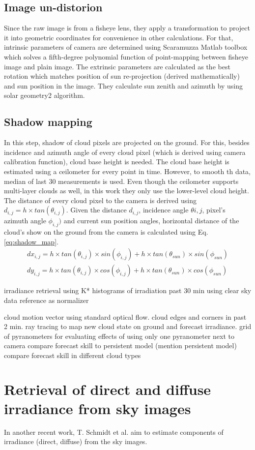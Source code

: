\subsection{Image un-distorion}
Since the raw image is from a fisheye lens, they apply a transformation to project it into geometric coordinates for convenience in other calculations. For that, intrinsic parameters of camera are determined using Scaramuzza Matlab toolbox \cite{fisheye_undistort} which solves a fifth-degree polynomial function of point-mapping between fisheye image and plain image. The extrinsic parameters are calculated as the best rotation which matches position of sun re-projection (derived mathematically) and sun position in the image. They calculate sun zenith and azimuth by using solar geometry2 algorithm\cite{sun_pos1}.

\subsection{Shadow mapping}
In this step, shadow of cloud pixels are projected on the ground. For this, besides incidence and azimuth angle of every cloud pixel (which is derived using camera calibration function), cloud base height is needed. The cloud base height is estimated using a ceilometer for every point in time. However, to smooth th data, median of last 30 measurements is used. Even though the ceilometer supports multi-layer clouds as well, in this work they only use the lower-level cloud height. The distance of every cloud pixel to the camera is derived using $d_{i,j} = h \times tan(\theta_{i,j})$. Given the distance $d_{i,j}$, incidence angle $\theta{i,j}$, pixel's azimuth angle $\phi_{i,j})$ and current sun position angles, horizontal distance of the cloud's show on the ground from the camera is calculated using Eq. \ref{eq:shadow_map}.
\begin{equation}
\label{eq:shadow_map}
\begin{split}
dx_{i,j} = h \times tan(\theta_{i,j}) \times sin(\phi_{i,j}) + h \times  tan(\theta_{sun}) \times sin(\phi_{sun}) \\
dy_{i,j} = h \times tan(\theta_{i,j}) \times cos(\phi_{i,j}) + h \times  tan(\theta_{sun}) \times cos(\phi_{sun})
\end{split}
\end{equation}


irradiance retrieval using K* histograms of irradiation past 30 min using clear sky data reference as normalizer

cloud motion vector using standard optical flow. cloud edges and corners in past 2 min.
ray tracing to map new cloud state on ground and forecast irradiance.
grid of pyranometers for evaluating effects of using only one pyranometer next to camera
compare forecast skill to persistent model (mention persistent model)
compare forecast skill in different cloud types



\section{Retrieval of direct and diffuse irradiance from sky images}
In another recent work, T. Schmidt et al.\cite{tSchmidt15} aim to estimate components of irradiance (direct, diffuse) from the sky images.